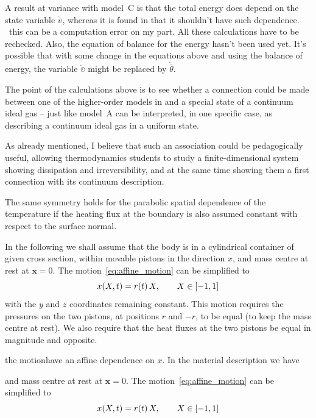 \documentclass[\ifafour a4paper,12pt,\else a5paper,10pt,\fi%
onecolumn,oneside,article,%
british%
]{memoir}
\theoremstyle{remark}
\theoremstyle{innote}
\DeclarePairedDelimiter\clcl{[}{]}
\renewcommand*{\|}[1][]{\nonscript\,#1\vert\nonscript\;\mathopen{}}
\newcommand*{\wrench}{{\fontencoding{U}\fontfamily{fontawesomethree}\selectfont\symbol{114}}}
\newcommand{\mynote}[1]{ {\color{notecolour}\wrench\ #1}}
\newcommand*{\yr}{r}
\newcommand*{\yt}{\theta}
\newcommand*{\yVb}{\bar{\upsilon}}
\newcommand*{\yVdd}{\ddot{\yVb}}
\newcommand*{\yx}{\bm{x}}
\newcommand*{\ytb}{\bar{\yt}}
\begin{document}
A result at variance with model~C is that the total energy does depend on
the state variable $\yVdd$, whereas it is found in
\citeauthor{pekaretal2014} that it shouldn't have such dependence.
\mynote{this can be a computation error on my part. All these calculations
  have to be rechecked. Also, the equation of balance for the energy hasn't
  been used yet. It's possible that with some change in the equations above
  and using the balance of energy, the variable $\yVdd$ might be replaced by
  $\dot{\ytb}$.}


\bigskip

The point of the calculations above is to see whether a connection could be
made between one of the higher-order models in \citeauthor{pekaretal2014}
and a special state of a continuum ideal gas – just like model~A can be
interpreted, in one specific case, as describing a continuum ideal gas in a
uniform state.

As already mentioned, I believe that such an association could be
pedagogically useful, allowing thermodynamics students to study a
finite-dimensional system showing dissipation and irreversibility, and at
the same time showing them a first connection with its continuum description.


\iffalse
The same symmetry holds for the parabolic
spatial dependence of the temperature if the heating flux at the boundary
is also assumed constant with respect to the surface normal.

In the following we shall assume that the body is in a cylindrical
container of given cross section, within movable pistons in the direction
$x$, and mass centre at rest at $\yx = 0$. The
motion~\eqref{eq:affine_motion} can be simplified to
\begin{equation}
  \label{eq:simplified_affine_motion}
  x(X,t) = \yr(t) \, X, \qquad X \in \clcl{-1, 1}
\end{equation}
with the $y$ and $z$ coordinates remaining constant. This motion requires
the pressures on the two pistons, at positions $\yr$ and $-\yr$, to be
equal (to keep the mass centre at rest). We also require that the heat
fluxes at the two pistons be equal in magnitude and opposite.





the motionhave an affine dependence on $x$. In the
material description we have


and mass centre at rest at $\yx = 0$. The
motion~\eqref{eq:affine_motion} can be simplified to
\begin{equation}
  \label{eq:simplified_affine_motion}
  x(X,t) = \yr(t) \, X, \qquad X \in \clcl{-1, 1}
\end{equation}
\end{document}
